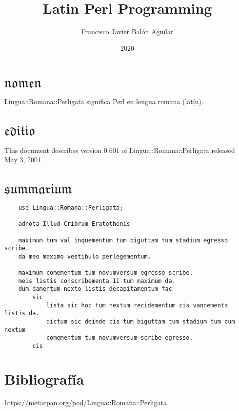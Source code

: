 \documentclass[a4paper, 11pt, titlepage]{article}
\title{\textbf{\nombre}\\ {\normalsize \textbf{Latin Perl Programming}}}
\author{Francisco Javier Balón Aguilar}
\date{2020}
\begin{document}

\maketitle %
\renewcommand{\contentsname}{Índice} %
\tableofcontents %
\newpage %

\section{$\mathfrak{nomen}$}

Lingua::Romana::Perligata significa Perl en lengua romana (latín).

\section{$\mathfrak{editio}$}

This document describes version 0.601 of Lingua::Romana::Perligata released May 3, 2001.

\section{$\mathfrak{summarium}$}

\begin{verbatim}
    use Lingua::Romana::Perligata;
 
    adnota Illud Cribrum Eratothenis
    
    maximum tum val inquementum tum biguttam tum stadium egresso scribe.
    da meo maximo vestibulo perlegementum.
    
    maximum comementum tum novumversum egresso scribe.
    meis listis conscribementa II tum maximum da.
    dum damentum nexto listis decapitamentum fac
        sic
            lista sic hoc tum nextum recidementum cis vannementa listis da.
            dictum sic deinde cis tum biguttam tum stadium tum cum nextum
            comementum tum novumversum scribe egresso.
        cis
\end{verbatim}

\section{Bibliografía}

https://metacpan.org/pod/Lingua::Romana::Perligata
\end{document}
